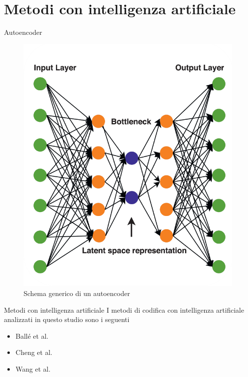 \section{Metodi con intelligenza artificiale}

    \begin{frame}{Autoencoder}
        \begin{figure}[t!]
            \centering
            \includegraphics[width=0.5\textheight]{Immagini/Autoencoder_scheme.png}
            \caption{Schema generico di un autoencoder}
            \label{fig:schemeAutoencoder}
        \end{figure}
    \end{frame}

    \begin{frame}{Metodi con intelligenza artificiale}
        I metodi di codifica con intelligenza artificiale analizzati in questo studio sono i seguenti
        \begin{itemize}
            \item Ballé et al. \cite{minnen2018joint}
            \item Cheng et al. \cite{cheng2020learned}
            \item Wang et al. \cite{wang2022neural} 
        \end{itemize}
    \end{frame}

